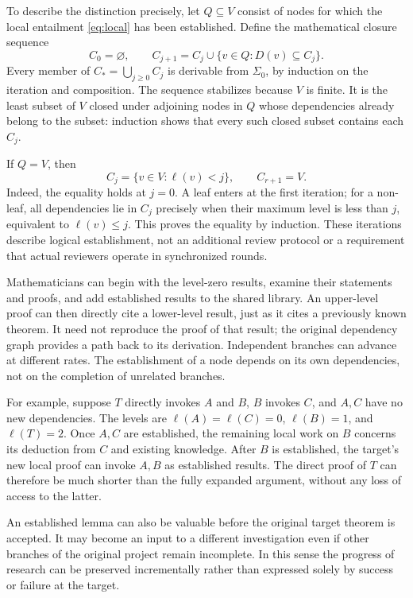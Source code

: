 \documentclass[11pt,a4paper]{article}
\theoremstyle{definition}\newtheorem{definition}{Definition}
\begin{document}
To describe the distinction precisely, let $Q\subseteq V$ consist of nodes for which the local entailment \eqref{eq:local} has been established. Define the mathematical closure sequence
\[
 C_0=\varnothing,\qquad
 C_{j+1}=C_j\cup\{v\in Q:D(v)\subseteq C_j\}.
\]
Every member of $C_*=\bigcup_{j\ge0} C_j$ is derivable from $\Sigma_0$, by induction on the iteration and composition. The sequence stabilizes because $V$ is finite. It is the least subset of $V$ closed under adjoining nodes in $Q$ whose dependencies already belong to the subset: induction shows that every such closed subset contains each $C_j$.

If $Q=V$, then
\[
 C_j=\{v\in V:\ell(v)<j\},\qquad C_{r+1}=V.
\]
Indeed, the equality holds at $j=0$. A leaf enters at the first iteration; for a non-leaf, all dependencies lie in $C_j$ precisely when their maximum level is less than $j$, equivalent to $\ell(v)\le j$. This proves the equality by induction. These iterations describe logical establishment, not an additional review protocol or a requirement that actual reviewers operate in synchronized rounds.

Mathematicians can begin with the level-zero results, examine their statements and proofs, and add established results to the shared library. An upper-level proof can then directly cite a lower-level result, just as it cites a previously known theorem. It need not reproduce the proof of that result; the original dependency graph provides a path back to its derivation. Independent branches can advance at different rates. The establishment of a node depends on its own dependencies, not on the completion of unrelated branches.

For example, suppose $T$ directly invokes $A$ and $B$, $B$ invokes $C$, and $A,C$ have no new dependencies. The levels are $\ell(A)=\ell(C)=0$, $\ell(B)=1$, and $\ell(T)=2$. Once $A,C$ are established, the remaining local work on $B$ concerns its deduction from $C$ and existing knowledge. After $B$ is established, the target's new local proof can invoke $A,B$ as established results. The direct proof of $T$ can therefore be much shorter than the fully expanded argument, without any loss of access to the latter.

An established lemma can also be valuable before the original target theorem is accepted. It may become an input to a different investigation even if other branches of the original project remain incomplete. In this sense the progress of research can be preserved incrementally rather than expressed solely by success or failure at the target.
\end{document}
